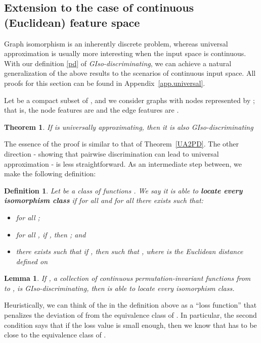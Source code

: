 \documentclass{article}
\newtheorem{theorem}{Theorem}
\newtheorem{lemma}{Lemma}
\newtheorem{definition}{Definition}
\begin{document}
\subsection{Extension to the case of continuous (Euclidean) feature space}
Graph isomorphism is an inherently discrete problem, whereas universal approximation is usually more interesting when the input space is continuous. With our definition \ref{pd} of \textit{GIso-discriminating}, we can achieve a natural generalization of the above results to the scenarios of continuous input space. All proofs for this section can be found in Appendix~\ref{app.universal}.

Let  be a compact subset of , and we consider graphs with  nodes represented by ; that is, the node features are  and the edge features are .





\begin{theorem}\label{ua2pdinf}
If  is universally approximating, then it is also GIso-discriminating
\end{theorem}

The essence of the proof is similar to that of Theorem~\ref{UA2PD}. The other direction - showing that  pairwise discrimination can lead to universal approximation - is less straightforward. As an intermediate step between, we make the following definition:

\begin{definition}
\label{locate}
Let  be a class of functions . We say it is able to \textbf{locate every isomorphism class} if for all  and for all  there exists  such that:
\begin{itemize}
    \item for all ;
    \item for all , if , then ; and
    \item there exists  such that if , then  such that , where  is the Euclidean distance defined on 
\end{itemize}
\end{definition}

\begin{lemma} \label{lemma.C+1}
If , a collection of continuous permutation-invariant functions from  to , is GIso-discriminating, then  is able to locate every isomorphism class.
\end{lemma}

Heuristically, we can think of the  in the definition above as a ``loss function'' that penalizes the deviation of  from the equivalence class of . In particular, the second condition says that if the loss value is small enough, then we know that  has to be close to the equivalence class of .
\end{document}
